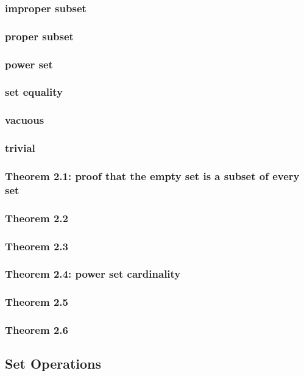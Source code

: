 \documentclass[a4paper]{article}
\begin{document}
\subsubsection*{improper subset}
\subsubsection*{proper subset}
\subsubsection*{power set}
\subsubsection*{set equality}
\subsubsection*{vacuous}
\subsubsection*{trivial}
\subsubsection*{Theorem 2.1: proof that the empty set is a subset of every set}
\subsubsection*{Theorem 2.2}
\subsubsection*{Theorem 2.3}
\subsubsection*{Theorem 2.4: power set cardinality}
\subsubsection*{Theorem 2.5}
\subsubsection*{Theorem 2.6}

\newpage
\subsection{Set Operations}   %
\end{document}
